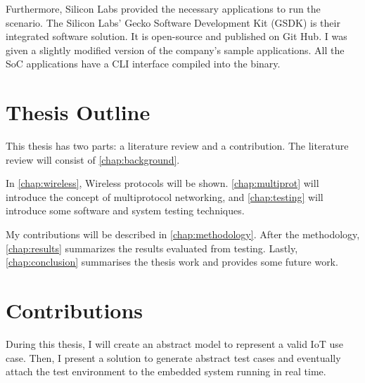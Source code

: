 Furthermore, Silicon Labs provided the necessary applications to run the scenario. The Silicon Labs' Gecko Software Development Kit (GSDK) is their integrated software solution. It is open-source and published on Git Hub\cite{silabs_gsdk:2023}. I was given a slightly modified version of the company's sample applications. All the SoC applications have a CLI interface compiled into the binary.

\section{Thesis Outline}

This thesis has two parts: a literature review and a contribution. The literature review will consist of \autoref{chap:background}.

In \autoref{chap:wireless}, Wireless protocols will be shown.
\autoref{chap:multiprot} will introduce the concept of multiprotocol networking, and \autoref{chap:testing} will introduce some software and system testing techniques.

My contributions will be described in \autoref{chap:methodology}. After the methodology, \autoref{chap:results} summarizes the results evaluated from testing. Lastly, \autoref{chap:conclusion} summarises the thesis work and provides some future work.



\section{Contributions}
During this thesis, I will create an abstract model to represent a valid IoT use case. Then, I present a solution to generate abstract test cases and eventually attach the test environment to the embedded system running in real time.